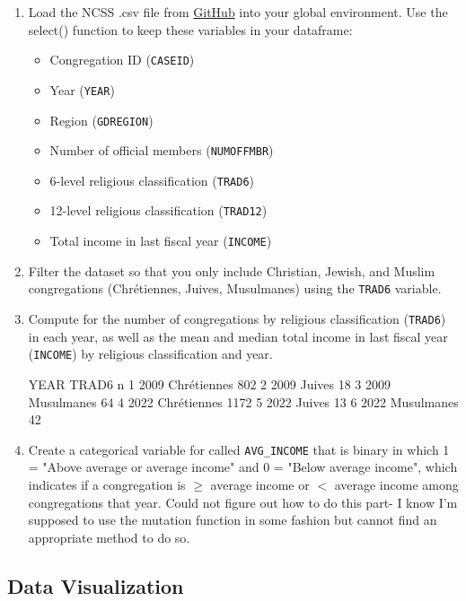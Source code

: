 \documentclass[12pt,letterpaper]{article}
\begin{document}
\begin{enumerate}
\item Load the NCSS .csv file from \href{https://raw.githubusercontent.com/ASDS-TCD/DataViz_2026/refs/heads/main/datasets/NCSS_v1.csv}{GitHub} into your global environment. Use the select() function to keep these variables in your dataframe:
\begin{itemize}
	\item Congregation ID (\texttt{CASEID})
	\item Year (\texttt{YEAR})
	\item Region (\texttt{GDREGION})
	\item Number of official members (\texttt{NUMOFFMBR})
	\item 6-level religious classification (\texttt{TRAD6})
	\item 12-level religious classification (\texttt{TRAD12})
	\item Total income in last fiscal year (\texttt{INCOME})
\end{itemize}
\item Filter the dataset so that you only include Christian, Jewish, and Muslim congregations (Chrétiennes, Juives, Musulmanes) using the \texttt{TRAD6} variable.



\item Compute for the number of congregations by religious classification (\texttt{TRAD6}) in each year, as well as the mean and median total income in last fiscal year (\texttt{INCOME}) by religious classification and year.


  YEAR       TRAD6    n
1 2009 Chrétiennes  802
2 2009      Juives   18
3 2009  Musulmanes   64
4 2022 Chrétiennes 1172
5 2022      Juives   13
6 2022  Musulmanes   42

\item Create a categorical variable for called \texttt{AVG\_INCOME} that is binary in which 1 = "Above average or average income" and 0 = "Below average income", which indicates if a congregation is $\geq$ average income or $<$ average income among congregations that year.
Could not figure out how to do this part- I know I'm supposed to use the mutation function in some fashion but cannot find an appropriate method to do so.
\end{enumerate}

\subsection*{Data Visualization}
\end{document}
